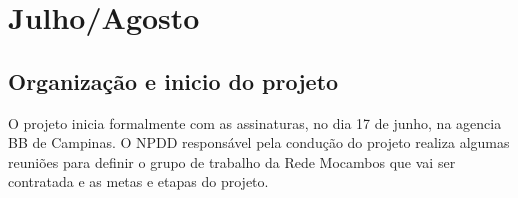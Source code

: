 \documentclass[a4paper, 11pt, oneside]{Relatorio_sem}  %
\begin{document}
%






\mainmatter	  %
\pagestyle{fancy}  %


\part{Julho/Agosto} %

\chapter{Organização e inicio do projeto}\lhead{\leftmark}
O projeto inicia formalmente com as assinaturas, no dia 17 de junho, na
agencia BB de Campinas. O NPDD responsável pela condução do projeto
realiza algumas reuniões para definir o grupo de trabalho da Rede
Mocambos que vai ser contratada e as metas e etapas do projeto.
\end{document}
